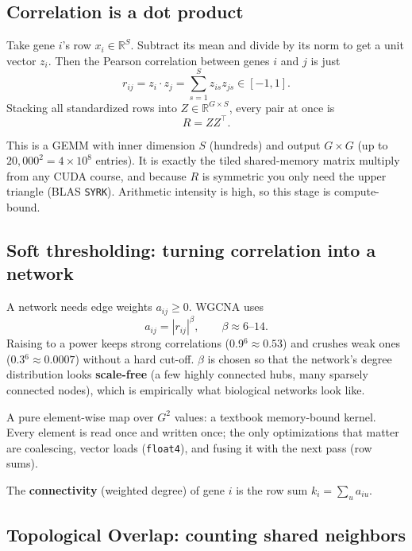 \documentclass[11pt]{article}
\begin{document}
\subsection{Correlation is a dot product}

Take gene $i$'s row $x_i\in\mathbb{R}^S$. Subtract its mean and divide by its
norm to get a unit vector $z_i$. Then the Pearson correlation between genes
$i$ and $j$ is just
\[
r_{ij} = z_i\cdot z_j = \sum_{s=1}^{S} z_{is} z_{js} \in [-1,1].
\]
Stacking all standardized rows into $Z\in\mathbb{R}^{G\times S}$, every pair at
once is
\[
R = Z Z^{\top}.
\]

\begin{analogy}
This is a GEMM with inner dimension $S$ (hundreds) and output $G\times G$
(up to $20{,}000^2 = 4\times10^8$ entries). It is exactly the tiled
shared-memory matrix multiply from any CUDA course, and because $R$ is
symmetric you only need the upper triangle (BLAS \texttt{SYRK}). Arithmetic
intensity is high, so this stage is compute-bound.
\end{analogy}

\subsection{Soft thresholding: turning correlation into a network}

A network needs edge weights $a_{ij}\ge0$. WGCNA uses
\[
a_{ij} = |r_{ij}|^{\beta}, \qquad \beta \approx 6\text{--}14.
\]
Raising to a power keeps strong correlations (0.9$^{6}\approx0.53$) and
crushes weak ones (0.3$^{6}\approx0.0007$) without a hard cut-off. $\beta$ is
chosen so that the network's degree distribution looks \textbf{scale-free}
(a few highly connected hubs, many sparsely connected nodes), which is
empirically what biological networks look like.

\begin{analogy}
A pure element-wise map over $G^2$ values: a textbook memory-bound kernel.
Every element is read once and written once; the only optimizations that
matter are coalescing, vector loads (\texttt{float4}), and fusing it with the
next pass (row sums).
\end{analogy}

The \textbf{connectivity} (weighted degree) of gene $i$ is the row sum
$k_i = \sum_u a_{iu}$.

\subsection{Topological Overlap: counting shared neighbors}
\end{document}

